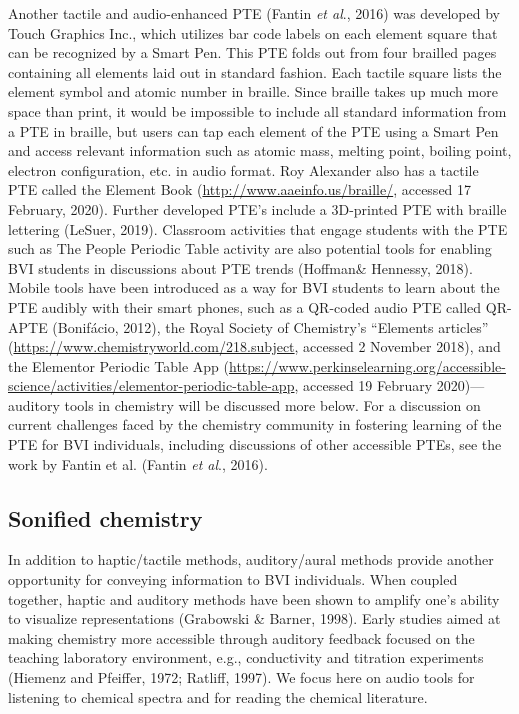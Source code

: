\documentclass[11.5pt]{sig-alternate} %
\begin{document}
\begin{large}
Another tactile and audio-enhanced PTE (Fantin \textit{et al}., 2016) was developed by Touch Graphics Inc., which utilizes bar code labels on each element square that can be recognized by a Smart Pen. This PTE folds out from four brailled pages containing all elements laid out in standard fashion. Each tactile square lists the element symbol and atomic number in braille. Since braille takes up much more space than print, it would be impossible to include all standard information from a PTE in braille, but users can tap each element of the PTE using a Smart Pen and access relevant information such as atomic mass, melting point, boiling point, electron configuration, etc. in audio format. Roy Alexander also has a tactile PTE called the Element Book (\url{http://www.aaeinfo.us/braille/}, accessed 17 February, 2020). Further developed PTE’s include a 3D-printed PTE with braille lettering (LeSuer, 2019). Classroom activities that engage students with the PTE such as The People Periodic Table activity are also potential tools for enabling BVI students in discussions about PTE trends (Hoffman\& Hennessy, 2018). Mobile tools have been introduced as a way for BVI students to learn about the PTE audibly with their smart phones, such as a QR-coded audio PTE called QR-APTE (Bonifácio, 2012), the Royal Society of Chemistry’s “Elements articles” (\url{https://www.chemistryworld.com/218.subject}, accessed 2 November 2018), and the Elementor Periodic Table App (\url{https://www.perkinselearning.org/accessible-science/activities/elementor-periodic-table-app}, accessed 19 February 2020)—auditory tools in chemistry will be discussed more below. For a discussion on current challenges faced by the chemistry community in fostering learning of the PTE for BVI individuals, including discussions of other accessible PTEs, see the work by Fantin et al. (Fantin \textit{et al}., 2016). 

\subsection*{Sonified chemistry}

In addition to haptic/tactile methods, auditory/aural methods provide another opportunity for conveying information to BVI individuals. When coupled together, haptic and auditory methods have been shown to amplify one’s ability to visualize representations (Grabowski \& Barner, 1998). Early studies aimed at making chemistry more accessible through auditory feedback focused on the teaching laboratory environment, e.g., conductivity and titration experiments (Hiemenz and Pfeiffer, 1972; Ratliff, 1997). We focus here on audio tools for listening to chemical spectra and for reading the chemical literature. 


\end{large}
\end{document}
